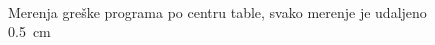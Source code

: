 \documentclass{article}
\begin{document}
    \begin{figure}[H]
        \centering
         \\

        \caption{Merenja greške programa po centru table, svako merenje je udaljeno \SI{0.5}{\cm}}
        \label{Centar}
    \end{figure}
\end{document}
